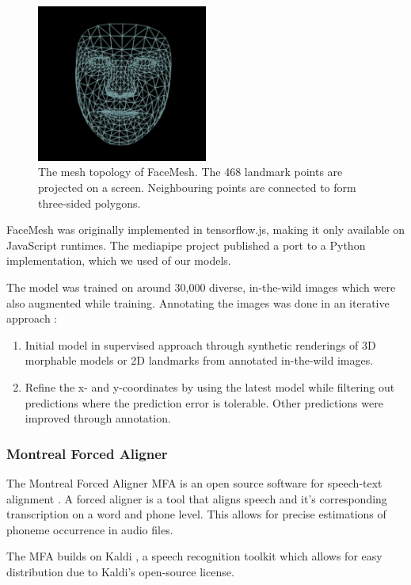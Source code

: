 \begin{figure}
    \centering
    \includegraphics[width=0.5\textwidth]{res/facemesh2.png}
    \caption{The mesh topology of FaceMesh. The 468 landmark points are projected on a screen. Neighbouring points are connected to form three-sided polygons.}
    \label{fig:facemesh}
\end{figure}

FaceMesh was originally implemented in tensorflow.js, making it only available on JavaScript runtimes. The mediapipe project published a port to a Python implementation, which we used of our models.

The model was trained on around 30,000 diverse, in-the-wild images which were also augmented while training. Annotating the images was done in an iterative approach \cite{kartynnik2019facemesh}:
\begin{enumerate}
    \item Initial model in supervised approach through synthetic renderings of 3D morphable models or 2D landmarks from annotated in-the-wild images.
    \item Refine the x- and y-coordinates by using the latest model while filtering out predictions where the prediction error is tolerable. Other predictions were improved through annotation.
\end{enumerate}
\subsubsection{Montreal Forced Aligner}
\label{sub:mfa}
The Montreal Forced Aligner MFA is an open source software for speech-text alignment \cite{mcauliffe2017montreal}. A forced aligner is a tool that aligns speech and it's corresponding transcription on a word and phone level. This allows for precise estimations of phoneme occurrence in audio files.

The MFA builds on Kaldi \cite{povey2011kaldi}, a speech recognition toolkit which allows for easy distribution due to Kaldi's open-source license.

